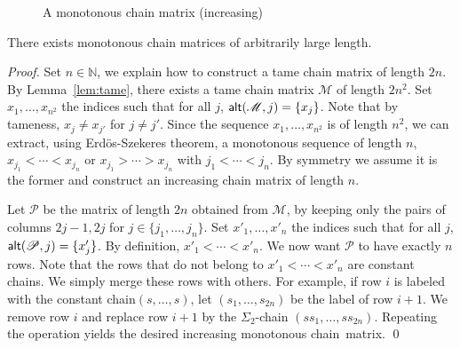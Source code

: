 \documentclass[envcountsame]{llncs}
\newcommand\nat{\ensuremath{\mathbb{N}}\xspace}
\newcommand\mat{\ensuremath{\mathscr{M}}\xspace}
\newcommand\pat{\ensuremath{\mathscr{P}}\xspace}
\newcommand{\sic}[1]{\ensuremath{\Sigma_{#1}}\xspace}
\newcommand\chain{chain\xspace}
\newcommand\qchain[1]{\ensuremath{\sic{#1}}-chain\xspace}
\newcommand\dchain{\qchain{2}}
\begin{document}
\begin{figure}[h]
\begin{center}
  \end{center}
  \caption{A monotonous \chain matrix (increasing)}
  \label{fig:inctame}
\end{figure}

\begin{lemma} \label{lem:mono}
  There exists monotonous \chain matrices of arbitrarily large length.
\end{lemma}

\begin{proof}
  Set $n \in \nat$, we explain how to construct a tame \chain matrix of
  length $2n$. By Lemma~\ref{lem:tame}, there exists a tame \chain matrix
  \mat of length $2n^2$. Set $x_1,\dots,x_{n^2}$ the indices such that
  for all $j$, $\alt{\mat}{j} = \{x_j\}$. Note that by tameness, $x_j
  \neq x_{j'}$ for $j \neq j'$. Since the sequence $x_1,\dots,x_{n^2}$
  is of length $n^2$, we can extract, using Erd\"os-Szekeres theorem, a
  monotonous sequence of length $n$, $x_{j_1} < \cdots < x_{j_n}$ or
  $x_{j_1} > \cdots > x_{j_n}$ with $j_1 < \cdots < j_n$.  By symmetry
  we assume it is the former and construct an increasing \chain matrix
  of length $n$.

  Let \pat be the matrix of length $2n$ obtained from \mat, by keeping
  only the pairs of columns $2j-1,2j$ for $j \in \{j_1,\dots,j_n\}$. Set
  $x'_1,\dots,x'_{n}$ the indices such that for all $j$, $\alt{\pat}{j}
  = \{x'_j\}$. By definition, $x'_{1} < \cdots < x'_{n}$. We now want
  $\pat$ to have exactly $n$ rows. Note that the rows  that do not belong to
  $x'_{1} < \cdots < x'_{n}$ are constant chains. We simply merge these rows
  with others. For example, if row $i$ is labeled with the 
  constant \chain $(s,\dots,s)$, let $(s_1,\dots,s_{2n})$ be the label of
  row $i+1$. We remove row $i$ and replace row $i+1$ by the \dchain
  $(ss_1,\dots,ss_{2n})$. Repeating the operation yields the desired increasing
  monotonous \chain~matrix. \qed
\end{proof}
\end{document}
